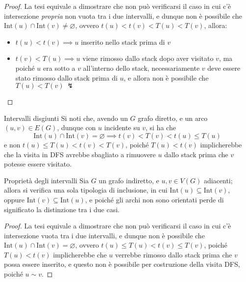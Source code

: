 \documentclass[a4paper, 12pt]{report}
\begin{document}
    \begin{proof}
        La tesi equivale a dimostrare che non può verificarsi il caso in cui c'è intersezione \textit{propria} non vuota tra i due intervalli, e dunque non è possibile che $\mathrm{Int}(u) \cap \mathrm{Int}(v) \neq \varnothing$, ovvero $t(u) < t(v) < T(u) < T(v)$, allora:

        \begin{itemize}
            \item $t(u) < t(v) \implies u$ inserito nello stack prima di $v$
            \item $t(v) < T(u) \implies u$ viene rimosso dallo stack dopo aver visitato $v$, ma poiché $u$ era sotto a $v$ all'interno dello stack, necessariamente $v$ deve essere stato rimosso dallo stack prima di $u$, e allora non è possibile che $T(u) < T(v) \ \lightning$
        \end{itemize}
    \end{proof}

    \begin{framedobs}{Intervalli disgiunti}
        Si noti che, avendo un $G$ grafo diretto, e un arco $(u, v) \in E(G)$, dunque con $u$ incidente su $v$, si ha che $$\mathrm{Int}(u) \cap \mathrm{Int}(v) = \varnothing \implies t(v) < T(v) < t(u) \le T(u)$$ e non $t(u) \le T(u) < t(v) < T(v)$, poiché $T(u) < t(v)$ implicherebbe che la visita in DFS avrebbe sbagliato a rimuovere $u$ dallo stack prima che $v$ potesse essere visitato.
    \end{framedobs}

    \begin{framedlem}{Proprietà degli intervalli}
        Sia $G$ un grafo indiretto, e $u, v \in V(G)$ adiacenti; allora si verifica una sola tipologia di inclusione, in cui $\mathrm{Int}(u) \subseteq \mathrm{Int}(v)$, oppure $\mathrm{Int}(v) \subseteq \mathrm{Int}(u)$, e poiché gli archi non sono orientati perde di significato la distinzione tra i due casi.
    \end{framedlem}

    \begin{proof}
        La tesi equivale a dimostrare che non può verificarsi il caso in cui c'è intersezione vuota tra i due intervalli, e dunque non è possibile che $\mathrm{Int}(u) \cap \mathrm{Int}(v) = \varnothing$, ovvero $t(u) \le T(u) < t(v) \le T(v)$, poiché $T(u) < t(v)$ implicherebbe che $u$ verrebbe rimosso dallo stack prima che $v$ possa essere inserito, e questo non è possibile per costruzione della visita DFS, poiché $u \sim v$.
    \end{proof}
\end{document}

